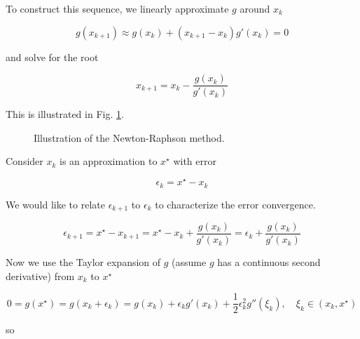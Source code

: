 To construct this sequence, we linearly approximate $g$ around
$x_k$

\begin{equation}
    g\left(x_{k+1}\right) \approx g\left(x_k\right)+\left(x_{k+1}-x_k\right) g'(x_k) =0
\end{equation}

and solve for the root

\begin{equation}
    x_{k+1}=x_k-\frac{g\left(x_k\right)}{g'(x_k)}
\end{equation}

This is illustrated in Fig. \ref{fig:newton_raphson}.

\begin{figure}[!htb]
    \centering
    
    \caption{Illustration of the Newton-Raphson method.}
    \label{fig:newton_raphson}
\end{figure}



Consider $x_k$ is an approximation to $x^\star$ with error

\begin{equation}
    \epsilon_k = x^\star - x_k
\end{equation}

We would like to relate $\epsilon_{k+1}$ to $\epsilon_k$ to characterize
the error convergence. 

\begin{equation}
    \epsilon_{k+1} = x^\star - x_{k+1} = x^\star - x_k + \frac{g\left(x_k\right)}{g'(x_k)} = \epsilon_k + \frac{g\left(x_k\right)}{g'(x_k)}
\end{equation}

Now we use the Taylor expansion of $g$ (assume $g$ has a continuous second derivative) from $x_k$ to $x^\star$

\begin{equation}
    0 = g(x^\star) = g(x_k + \epsilon_k) = g(x_k) + \epsilon_k g'(x_k) + \frac{1}{2} \epsilon_k^2 g''(\xi_k), \quad \xi_k \in (x_k,x^\star)
\end{equation}

so

